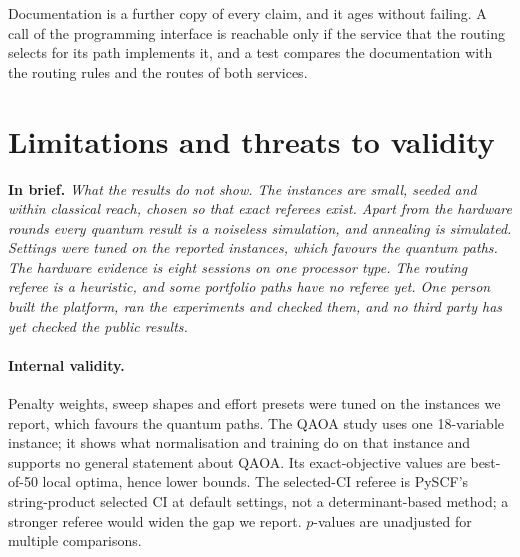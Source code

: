 \documentclass[11pt,a4paper]{article}
\newcommand{\inbrief}[1]{\par\smallskip\noindent\textbf{In brief.} \emph{#1}\par\medskip}
\begin{document}
Documentation is a further copy of every claim, and it ages without
failing. A call of the programming interface is reachable only if the
service that the routing
selects for its path implements it, and a test compares the
documentation with the routing rules and the routes of both services.

\section{Limitations and threats to validity}
\label{sec:limitations}

\inbrief{What the results do not show. The instances are small, seeded and
within classical reach, chosen so that exact referees exist. Apart from the
hardware rounds every quantum result is a noiseless simulation, and
annealing is simulated. Settings were tuned on the reported instances, which
favours the quantum paths. The hardware evidence is eight sessions on one
processor type. The routing referee is a heuristic, and some portfolio paths
have no referee yet. One person built the platform, ran the experiments and
checked them, and no third party has yet checked the public results.}

\paragraph{Internal validity.} Penalty weights, sweep shapes and effort
presets were tuned on the instances we report, which favours the quantum
paths. The QAOA study uses one 18-variable instance; it shows what
normalisation and training do on that instance and supports no general
statement about QAOA. Its
exact-objective values are best-of-50 local optima, hence lower bounds. The
selected-CI referee is PySCF's string-product selected CI at default
settings, not a determinant-based method; a stronger referee would widen the
gap we report. $p$-values are unadjusted for multiple comparisons.
\end{document}
